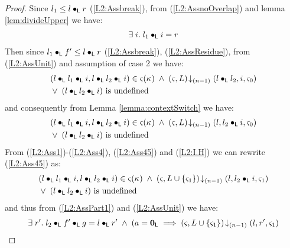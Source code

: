 \begin{lemma}[]
\begin{proof}
Since $l_1 \leq l \bullet_{\textsf{L}} r$ (\ref{L2:Assbreak}), from (\ref{L2:AssnoOverlap}) and lemma \ref{lem:divideUpper} we have:
%
\begin{align}
	\exists\; i.\; l_1 \bullet_{\textsf{L}} i = r \label{L2:AssResidue}
\end{align}
Then since $l_1 \bullet_{\textsf{L}} f' \leq l \bullet_{\textsf{L}} r$ (\ref{L2:Assbreak}), (\ref{L2:AssResidue}), from (\ref{L2:AssUnit}) and assumption of case 2 we have:
%
\begin{align}
	& (l \bullet_{\textsf{L}} l_1 \bullet_{\textsf{L}} i, l \bullet_{\textsf{L}} l_2 \bullet_{\textsf{L}} i) \in \varsigma_{}(\kappa_{}) \;\land\; \left(\varsigma_{}, L\right) \!\downarrow_{(n-1)} \left(l \bullet_{\textsf{L}} l_2, i, \varsigma_{0}\right) \nonumber\\
	& \lor\; (l \bullet_{\textsf{L}} l_2 \bullet_{\textsf{L}} i) \text{ is undefined} \label{L2:Ass49}
\end{align} 
%
and consequently from Lemma  \ref{lemma:contextSwitch} we have:
%
\begin{align}
	& (l \bullet_{\textsf{L}} l_1 \bullet_{\textsf{L}} i, l \bullet_{\textsf{L}} l_2 \bullet_{\textsf{L}} i) \in \varsigma_{}(\kappa_{}) \;\land\; \left(\varsigma_{}, L\right) \!\downarrow_{(n-1)} \left(l , l_2 \bullet_{\textsf{L}}  i, \varsigma_{0}\right) \nonumber\\
	& \lor\; (l \bullet_{\textsf{L}} l_2 \bullet_{\textsf{L}} i) \text{ is undefined} \label{L2:Ass45}
\end{align} 
%
From (\ref{L2:Ass1})-(\ref{L2:Ass4}), (\ref{L2:Ass45}) and (\ref{L2:I.H}) we can rewrite (\ref{L2:Ass45}) as:
\begin{align}
	& (l \bullet_{\textsf{L}} l_1 \bullet_{\textsf{L}} i, l \bullet_{\textsf{L}} l_2 \bullet_{\textsf{L}} i) \in \varsigma_{}(\kappa_{}) \;\land\; \left(\varsigma_{}, L \cup \{\varsigma_{1}\}\right) \!\downarrow_{(n-1)} \left(l , l_2 \bullet_{\textsf{L}}  i, \varsigma_{1}\right) \nonumber\\
	& \lor\; (l \bullet_{\textsf{L}} l_2 \bullet_{\textsf{L}} i) \text{ is undefined} \label{L2:Ass52}
\end{align}
%
and thus from (\ref{L2:AssPart1}) and (\ref{L2:AssUnit}) we have:
%
\begin{align}
	\exsts{r'}	l_2 \composeL f' \composeL g = l \composeL r' \;\land\; (a = \unitL \implies \extendsAMUpto{\amod{}, L \cup \{\amod{1}\}}{(n-1)}{l }{r'}{\amod{1}} \nonumber\\

\end{align}
\end{proof}
\end{lemma}
